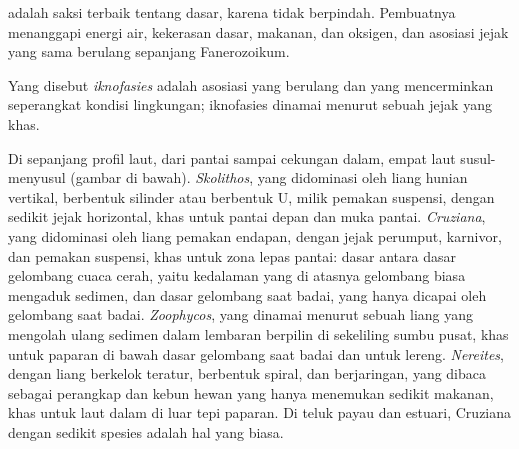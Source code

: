  adalah saksi terbaik tentang dasar, karena  tidak berpindah. Pembuatnya
menanggapi energi air, kekerasan dasar, makanan, dan oksigen, dan
asosiasi jejak yang sama berulang sepanjang Fanerozoikum.

\begin{definition}[Iknofasies]\label{def:b2:palaeoenvironments:ichnofacies}
Yang disebut \emph{iknofasies} adalah asosiasi  yang berulang dan yang
mencerminkan seperangkat kondisi lingkungan; iknofasies dinamai menurut sebuah jejak yang khas.
\end{definition}

Di sepanjang profil laut, dari pantai sampai cekungan dalam, empat  laut susul-menyusul
(gambar di bawah).  \emph{Skolithos}, yang didominasi oleh liang hunian vertikal, berbentuk silinder atau
berbentuk U, milik pemakan suspensi, dengan sedikit jejak horizontal, khas untuk
pantai depan dan muka pantai.  \emph{Cruziana}, yang didominasi oleh liang
pemakan endapan, dengan jejak perumput, karnivor, dan pemakan suspensi, khas untuk zona
lepas pantai: dasar antara dasar gelombang cuaca cerah, yaitu kedalaman yang di atasnya gelombang biasa mengaduk
sedimen, dan dasar gelombang saat badai, yang hanya dicapai oleh gelombang saat badai.  \emph{Zoophycos},
yang dinamai menurut sebuah liang yang mengolah ulang sedimen dalam lembaran berpilin di sekeliling sumbu
pusat, khas untuk paparan di bawah dasar gelombang saat badai dan untuk lereng.  \emph{Nereites},
dengan liang berkelok teratur, berbentuk spiral, dan berjaringan, yang dibaca sebagai perangkap dan
kebun hewan yang hanya menemukan sedikit makanan, khas untuk laut dalam di luar tepi paparan. Di
teluk payau dan estuari,  Cruziana dengan sedikit spesies adalah hal yang biasa.

